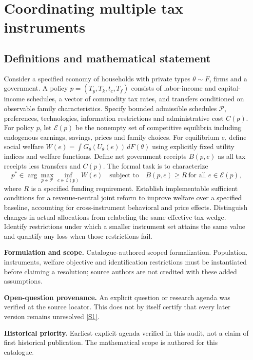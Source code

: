 \documentclass[11pt]{article}
\newcommand{\sref}[2]{\hyperlink{source:#1:#2}{[S#2]}}
\begin{document}
\section*{Coordinating multiple tax instruments}\label{30007753}
\subsection{Definitions and mathematical statement}
Consider a specified economy of households with private types \(\theta\sim F\), firms and a government. A policy \(p=(T_y,T_k,t_c,T_f)\) consists of labor-income and capital-income schedules, a vector of commodity tax rates, and transfers conditioned on observable family characteristics. Specify bounded admissible schedules \(\mathcal P\), preferences, technologies, information restrictions and administrative cost \(C(p)\). For policy \(p\), let \(\mathcal E(p)\) be the nonempty set of competitive equilibria including endogenous earnings, savings, prices and family choices. For equilibrium \(e\), define social welfare \(W(e)=\int G_\theta(U_\theta(e))\,dF(\theta)\) using explicitly fixed utility indices and welfare functions. Define net government receipts \(B(p,e)\) as all tax receipts less transfers and \(C(p)\). The formal task is to characterize
\[p^*\in\arg\max_{p\in\mathcal P}\inf_{e\in\mathcal E(p)} W(e)\quad\text{subject to}\quad B(p,e)\geq R\ \text{for all }e\in\mathcal E(p),\]
where \(R\) is a specified funding requirement. Establish implementable sufficient conditions for a revenue-neutral joint reform to improve welfare over a specified baseline, accounting for cross-instrument behavioral and price effects. Distinguish changes in actual allocations from relabeling the same effective tax wedge. Identify restrictions under which a smaller instrument set attains the same value and quantify any loss when those restrictions fail.

\par\textbf{Formulation and scope.} Catalogue-authored scoped formalization. Population, instruments, welfare objective and identification restrictions must be instantiated before claiming a resolution; source authors are not credited with these added assumptions.

\par\textbf{Open-question provenance.} An explicit question or research agenda was verified at the source locator. This does not by itself certify that every later version remains unresolved \sref{30007753}{1}.

\par\textbf{Historical priority.} Earliest explicit agenda verified in this audit, not a claim of first historical publication. The mathematical scope is authored for this catalogue.
\end{document}
